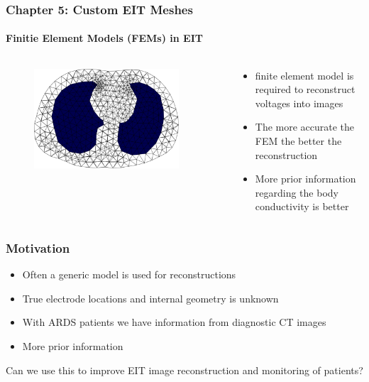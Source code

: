 \documentclass[10pt,    %
    english,            %
    xcolor=table,       %
    envcountsect,        %
    aspectratio=1610
]{beamer}
\begin{document}
\begin{frame}
	\frametitle{Chapter 5: Custom EIT Meshes}
	\framesubtitle{Finitie Element Models (FEMs) in EIT}    
	\begin{columns}[c]
		\begin{column}{0.5\textwidth}
			\begin{figure}[H]
				\centering
				\includegraphics[width=0.9\textwidth]{human_mesh_lungs.png}
			\end{figure}
		\end{column}
		\begin{column}{0.5\textwidth}
			\begin{itemize}
				\item finite element model is required to reconstruct voltages into images
				\item The more accurate the FEM the better the reconstruction
				\item \alert{More prior information regarding the body conductivity is better}
			\end{itemize}
		\end{column}
	\end{columns}
\end{frame}

\begin{frame}
	\frametitle{Motivation}    
	\begin{itemize}
		\item Often a generic model is used for reconstructions
		\item True electrode locations and internal geometry is unknown  
		\item With ARDS patients we have information from  diagnostic CT images
		\item More prior information 
	\end{itemize}
\vspace{2em}
\alert{Can we use this to improve EIT image reconstruction and monitoring of patients?}
\end{frame}
\end{document}
